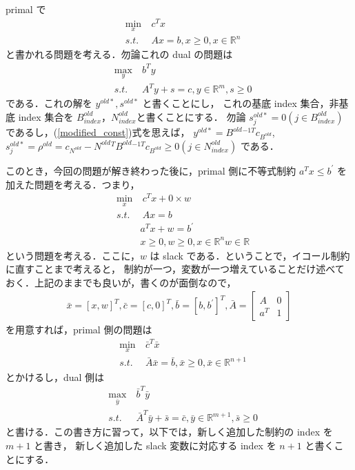\documentclass[11pt, a4]{article}
\begin{document}
primal で
\begin{eqnarray}
  &\min_{x}&\ c^Tx\nonumber\\
  &s.t.&\ Ax  = b, x\geq 0, x \in \mathbb{R}^n
  \label{old_LP}
\end{eqnarray}
と書かれる問題を考える．勿論これの dual の問題は
\begin{eqnarray}
  &\max_{y}&\ b^Ty\nonumber\\
  &s.t.&\ A^Ty  + s = c, y \in \mathbb{R}^m, s \geq 0
  \label{old_dual_LP}
\end{eqnarray}
である．これの解を $y^{old*}, s^{old*}$ と書くことにし，
これの基底 index 集合，非基底 index 集合を $B_{index}^{old}$，$N_{index}^{old}$と書くことにする．
勿論 $s^{old*}_{j} = 0 (j \in B_{index}^{old})$ であるし，(\ref{modified_const})式を思えば，
$y^{old*} = B^{old}{}^{-1 T}c_{B^{old}}$, $s^{old*}_{j}=\rho^{old} = c_{N^{old}} - N^{old}{}^{T} B^{old}{}^{-1 T}c_{B^{old}} \geq 0 (j \in N_{index}^{old})$
である．

このとき，今回の問題が解き終わった後に，primal 側に不等式制約 $a^Tx \leq b^{\prime}$ を加えた問題を考える．つまり，
\begin{eqnarray}
  &\min_{x}&\ c^Tx + 0\times w\nonumber\\
  &s.t.&\ Ax = b \nonumber\\
  &\ & a^Tx + w = b^{\prime}\nonumber\\
  &\ &x\geq 0, w\geq 0, x \in \mathbb{R}^n w\in \mathbb{R}
  \label{new_LP}
\end{eqnarray}
という問題を考える．ここに，$w$ は slack である．ということで，イコール制約に直すことまで考えると，
制約が一つ，変数が一つ増えていることだけ述べておく．上記のままでも良いが，書くのが面倒なので，
\begin{eqnarray}
  {\bar x} = [x, w]^T, {\bar c} = [c, 0]^T, {\bar b} = [b, b^{\prime}]^T,
  {\bar A} =
  \left[
    \begin{array}{c|c}
      A&0\nonumber\\
      \hline
      a^T&1
    \end{array}
    \right]
\end{eqnarray}
を用意すれば，primal 側の問題は
\begin{eqnarray}
  &\min_{x}&\ {\bar c}^T{\bar x}\nonumber\\
  &s.t.&\ {\bar A}{\bar x}  = {\bar b}, {\bar x}\geq 0, {\bar x} \in \mathbb{R}^{n+1}
  \label{new_LP}
\end{eqnarray}
とかけるし，dual 側は
\begin{eqnarray}
  &\max_{{\bar y}}&\ {\bar b}^T{\bar y}\nonumber\\
  &s.t.&\ {\bar A}^T{\bar y}  + {\bar s} = {\bar c}, {\bar y} \in \mathbb{R}^{m+1}, {\bar s} \geq 0
  \label{new_dual_LP}
\end{eqnarray}
と書ける．この書き方に習って，以下では，新しく追加した制約の index を $m + 1$ と書き，
新しく追加した slack 変数に対応する index を $n + 1$ と書くことにする．
\end{document}
